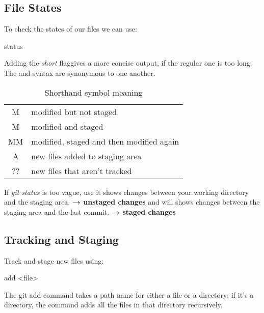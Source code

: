 \subsection{File States}
To check the states of our files we can use:
\begin{gitBashBox}
status
\end{gitBashBox}
\noindent Adding the \textit{short} flag\footnotemark gives a more concise output, if the regular one is too long. The  and  syntax are synonymous to one another.
\begin{table}[H]
    \centering
    \begin{tabular}{c|l}
       \hspace{2mm} M  & modified but not staged\\[2pt]
       M\hspace{3mm}   & modified and staged\\[2pt]
       MM  & modified, staged and then modified again \\[2pt]
       A\hspace{3mm}   & new files added to staging area \\[2pt]
       ?\hspace{0.7mm}?  & new files that aren't tracked \\
       
    \end{tabular}
    \caption{Shorthand symbol meaning}
    \label{tab:short_symbols}
\end{table}

\noindent If \textit{git status} is too vague, use  it shows changes between your working directory and the staging area. \textbf{→ unstaged changes}\newline
{} and \hspace{1mm}\footnotemark\hspace{0.2mm} will shows changes between the staging area and the last commit.  \textbf{→ staged changes}

\subsection{Tracking and Staging}
\noindent Track and stage new files using:
\begin{gitBashBox}
add <file>
\end{gitBashBox}
\noindent The git add command takes a path name for either a file or a directory; if it’s a directory, the command adds all the files in that directory recursively.

